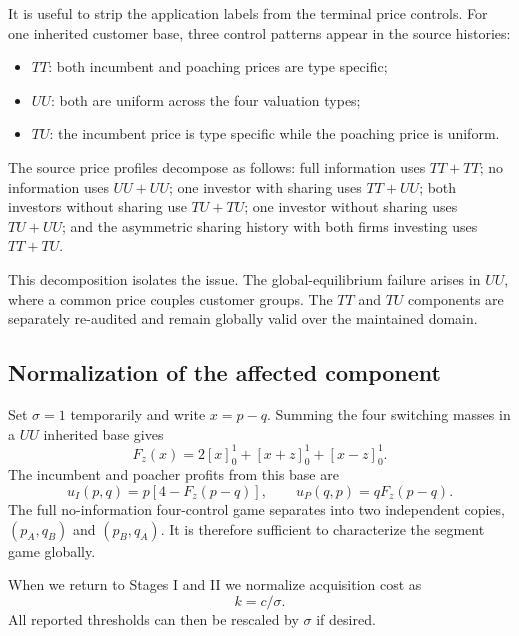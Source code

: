 It is useful to strip the application labels from the terminal price controls. For one inherited customer base, three control patterns appear in the source histories:
\begin{itemize}
\item \(TT\): both incumbent and poaching prices are type specific;
\item \(UU\): both are uniform across the four valuation types;
\item \(TU\): the incumbent price is type specific while the poaching price is uniform.
\end{itemize}
The source price profiles decompose as follows: full information uses \(TT+TT\); no information uses \(UU+UU\); one investor with sharing uses \(TT+UU\); both investors without sharing use \(TU+TU\); one investor without sharing uses \(TU+UU\); and the asymmetric sharing history with both firms investing uses \(TT+TU\).

This decomposition isolates the issue. The global-equilibrium failure arises in \(UU\), where a common price couples customer groups. The \(TT\) and \(TU\) components are separately re-audited and remain globally valid over the maintained domain.

\subsection{Normalization of the affected component}

Set \(\sigma=1\) temporarily and write \(x=p-q\). Summing the four switching masses in a \(UU\) inherited base gives
\[
F_z(x)=2[x]_0^1+[x+z]_0^1+[x-z]_0^1.
\]
The incumbent and poacher profits from this base are
\begin{equation}
u_I(p,q)=p[4-F_z(p-q)],
\qquad
u_P(q,p)=qF_z(p-q).
\label{eq:segmentpayoffs}
\end{equation}
The full no-information four-control game separates into two independent copies, \((p_A,q_B)\) and \((p_B,q_A)\). It is therefore sufficient to characterize the segment game globally.

When we return to Stages I and II we normalize acquisition cost as
\[
k=c/\sigma.
\]
All reported thresholds can then be rescaled by \(\sigma\) if desired.
